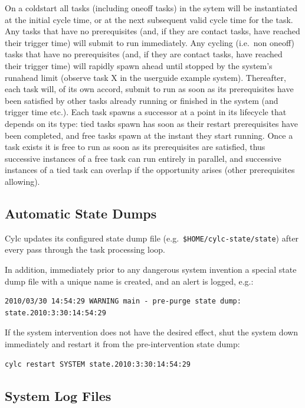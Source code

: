 \documentclass[11pt,a4paper]{article}
\begin{document}
On a coldstart all tasks (including oneoff tasks) in the sytem will be
instantiated at the initial cycle time, or at the next subsequent valid
cycle time for the task. Any tasks that have no prerequisites (and, if
they are contact tasks, have reached their trigger time) will submit to
run immediately. Any cycling (i.e.\ non oneoff) tasks that have no
prerequisites (and, if they are contact tasks, have reached their
trigger time) will rapidly spawn ahead until stopped by the system's
runahead limit (observe task X in the userguide example system).
Thereafter, each task will, of its own accord, submit to run as soon as
its prerequisites have been satisfied by other tasks already running or
finished in the system (and trigger time etc.).  Each task spawns a
successor at a point in its lifecycle that depends on its type: tied
tasks spawn has soon as their restart prerequisites have been completed,
and free tasks spawn at the instant they start running.  Once a task
exists it is free to run as soon as its prerequisites are satisfied,
thus successive instances of a free task can run entirely in parallel,
and successive instances of a tied task can overlap if the opportunity
arises (other prerequisites allowing).

\subsection{Automatic State Dumps}
\label{AutomaticStateDumps}

Cylc updates its configured state dump file (e.g.\
\lstinline=$HOME/cylc-state/state=) after every pass through the task 
processing loop.

In addition, immediately prior to any dangerous system invention a 
special state dump file with a unique name is created, and an alert is
logged, e.g.:

\begin{lstlisting}
2010/03/30 14:54:29 WARNING main - pre-purge state dump: state.2010:3:30:14:54:29
\end{lstlisting}

If the system intervention does not have the desired effect, shut the system 
down immediately and restart it from the pre-intervention state dump:

\begin{lstlisting}
cylc restart SYSTEM state.2010:3:30:14:54:29
\end{lstlisting}

\subsection{System Log Files}
\label{SystemLogFiles}
\end{document}
